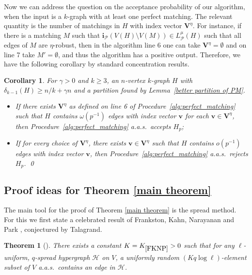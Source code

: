 \documentclass[11pt, letterpaper]{amsart}
\theoremstyle{plain}
\numberwithin{equation}{section}
\newtheorem{theorem}[thm]{Theorem}
\newtheorem{corollary}[thm]{Corollary}
\theoremstyle{definition}
\renewcommand{\vec}[1]{{\mathbf #1}}
\begin{document}
Now we can address the question on the acceptance probability of our algorithm, when the input is a $k$-graph with at least one perfect matching.
The relevant quantity is the number of matchings in $H$ with index vector $\vec{V}^\eta$.
For instance, if there is a matching $M$ such that $\vec{i}_{\mathcal P}(V(H)\setminus V(M))\in L^{\mu}_{\mathcal{P}}(H)$ such that all edges of $M$ are $\eta$-robust, then in the algorithm line 6 one can take $\vec{V}^\eta=\emptyset$ and on line 7 take $M'=\emptyset$, and thus the algorithm has a positive output.
Therefore, we have the following corollary by standard concentration results.
\begin{corollary}
For $\gamma>0$ and $k\ge 3$, an $n$-vertex $k$-graph $H$ with $\delta_{k-1}(H)\ge n/k+\gamma n$ and a partition found by Lemma~\ref{better partition of PM}.
\begin{itemize}
    \item If there exists $\vec{V}^\eta$ as defined on line 6 of Procedure~\ref{alg:perfect_matching} such that $H$ contains $\omega(p^{-1})$ edges with index vector $\vec{v}$ for each $\vec{v}\in \vec{V}^\eta$, then Procedure~\ref{alg:perfect_matching} a.a.s.~accepts $H_p$;
    \item If for every choice of $\vec{V}^\eta$, there exists $\vec{v}\in \vec{V}^\eta$ such that $H$ contains $o(p^{-1})$ edges with index vector $\vec{v}$, then Procedure~\ref{alg:perfect_matching} a.a.s.~rejects $H_p$. \qed
\end{itemize}
\end{corollary}


\subsection{Proof ideas for Theorem \ref{main theorem}}

The main tool for the proof of Theorem \ref{main theorem} is the spread method.
For this we first state a celebrated result of Frankston, Kahn, Narayanan and Park \cite{frankston2021thresholds}, conjectured by Talagrand.

    \begin{theorem}[\cite{frankston2021thresholds}]\label{FKNP}
        There exists a constant $ K=K_{\ref{FKNP}}>0 $ such that for any \(\ell\)-uniform, \(q\)-spread hypergraph \(\mathcal{H}\) on \(V\), a uniformly random \((Kq\log \ell)\)-element subset of \(V\) a.a.s.~contains an edge in \(\mathcal{H}\).
    \end{theorem}
\end{document}
